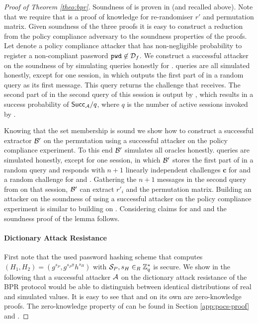 \begin{proof}[Proof of Theorem \ref{theo:bpr}]
\noindent
Soundness of \PoS is proven in \cite{FurukawaS01,Furukawa05} (and recalled above).
Note that we require that \PoS is a proof of knowledge for re-randomiser $r'$ and permutation matrix.
Given soundness of the three proofs it is easy to construct a reduction from the policy compliance adversary to the soundness properties of the proofs.
Let \cA denote a policy compliance attacker that has non-negligible probability to register a non-compliant password  $\mathtt{pwd}\not\in\mathcal{D}_f$.
We construct a successful attacker \cB on the soundness of \PoM by simulating \Execute queries honestly for \cA.
\Send queries are all simulated honestly, except for one session, in which \cB outputs the first part of \PoM in a random \Send query as its first message.
This \Send query returns the challenge that \cB receives.
The second part of \PoM in the second \Send query of this session is output by \cB, which results in a success probability of $\mathsf{Succ}_{\mathcal{A}}/q$, where $q$ is the number of active sessions invoked by \cA.

Knowing that the set membership \PoM is sound we show how to construct a successful extractor $\mathcal{B}'$ on the permutation \PoS using a successful attacker \cA on the policy compliance experiment.
To this end $\mathcal{B}'$ simulates all \Execute oracles honestly.
\Send queries are simulated honestly, except for one session, in which $\mathcal{B}'$ stores the first part of \PoS in a random \Send query and responds with $n+1$ linearly independent challenges $\bm c$ for \PoS and a random challenge \Client for \PoM and \PoE.
Gathering the $n+1$ messages in the second \Send query from \cA on that session, $\mathcal{B}'$ can extract $r'_i$ and the permutation matrix.
Building an attacker on the soundness of \PoE using a successful attacker \cA on the policy compliance experiment is similar to building \cB on \PoM.
Considering claims for \PoM and \PoE and the soundness proof of \PoS the lemma follows.
% 

\paragraph{Dictionary Attack Resistance}
First note that the used password hashing scheme that computes $(H_1,H_2)=(g^{s_P},\allowbreak g^{s_P \pi}h^{s_H})$ with $\mathcal{S}_P,s_H\in_R\mathbb{Z}^\ast_q$ is secure.
We show in the following that a successful attacker $\mathcal{A}$ on the dictionary attack resistance of the \ac{BPR} protocol would be able to distinguish between identical distributions of real and simulated values.
It is easy to see that \PoM and \PoE on its own are zero-knowledge proofs.
The zero-knowledge property of \PoS can be found in Section \ref{app:pocs-proof} and \cite{FurukawaS01,Furukawa05}.


\end{proof}
